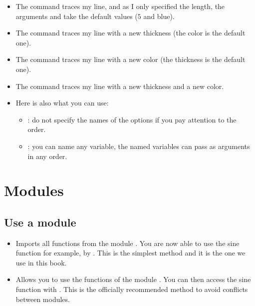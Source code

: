 \documentclass[11pt,class=report,crop=false]{standalone}
\begin{document}
\begin{itemize}
  \item The command  traces my line, and as I only specified the length, the arguments  and  take the default values ($5$ and blue).
  
   \item The command  traces my line with a new thickness (the color is the default one).
   
    \item The command  traces my line with a new color (the thickness is the default one).  
    
     \item The command  traces my line with a new thickness and a new color.
     
     \item Here is also what you can use:
     \begin{itemize}
       \item {}: do not specify the names of the options if you pay attention to the order.
       \item {}: you can name any variable, the named variables can pass as arguments in any order.
 
  \end{itemize}   
\end{itemize}

\section{Modules}

\subsection{Use a module}

\begin{itemize}
  \item {} \quad Imports all functions from the module . You are now able to use the sine function for example, by . This is the simplest method and it is the one we use in this book.
  
  \item {} \quad Allows you to use the functions of the module . You can then access the sine function with . This is the officially recommended method to avoid conflicts between modules.
\end{itemize}
\end{document}
